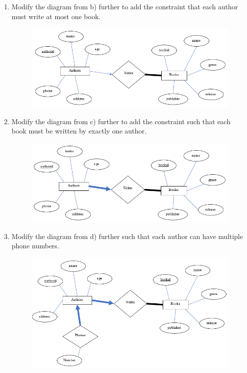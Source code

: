 \documentclass[letterpaper, 11pt]{article}
\begin{document}
\begin{enumerate}[label={\alph*}),leftmargin=*]
\begin{figure}[H]
    \end{figure}
    \item Modify the diagram from b) further to add the constraint that each author must write at most one book.
    \begin{figure}[H]
        \centering
        \includegraphics[scale=0.7]{hw2-1c.png}
    \end{figure}
    \item Modify the diagram from c) further to add the constraint such that each book must be written by exactly one author.
    \begin{figure}[H]
        \centering
        \includegraphics[scale=0.7]{hw2-1d.png}
    \end{figure}
    \item Modify the diagram from d) further such that each author can have multiple phone numbers.
    \begin{figure}[H]
        \centering
        \includegraphics[scale=0.7]{hw2-1e.png}

\end{figure}
\end{enumerate}
\end{document}
